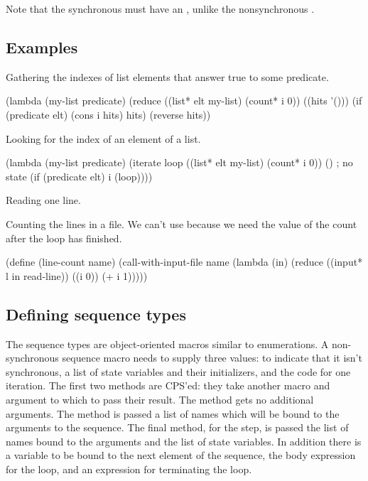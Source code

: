 Note that the synchronous  must have an , unlike the
 nonsynchronous .

\subsection{Examples}

\noindent
Gathering the indexes of list elements that answer true to some
predicate.
\begin{example}
(lambda (my-list predicate)
  (reduce ((list* elt my-list)
           (count* i 0))
          ((hits '()))
    (if (predicate elt)
        (cons i hits)
        hits)
    (reverse hits))
\end{example}

\noindent
Looking for the index of an element of a list.
\begin{example}
(lambda (my-list predicate)
  (iterate loop
           ((list* elt my-list)
            (count* i 0))
           ()                                ; no state
    (if (predicate elt)
        i
        (loop))))
\end{example}

\noindent
Reading one line.

\noindent
Counting the lines in a file.  We can't use  because we
need the value of the count after the loop has finished.
\begin{example}
(define (line-count name)
  (call-with-input-file name
    (lambda (in)
      (reduce ((input* l in read-line))
              ((i 0))
        (+ i 1)))))
\end{example}

\subsection{Defining sequence types}

The sequence types are object-oriented macros similar to enumerations.
A non-synchronous sequence macro needs to supply three values:
  to indicate that it isn't synchronous, a list of state variables
 and their initializers, and the code for one iteration.
The first
 two methods are CPS'ed: they take another macro and argument to
 which to pass their result.
The  method gets no additional arguments.
The  method is passed a list of names which
 will be bound to the arguments to the sequence.
The final method, for the step, is passed the list of names bound to
 the arguments and the list of state variables.
In addition there is
 a variable to be bound to the next element of the sequence, the
 body expression for the loop, and an expression for terminating the
 loop.

